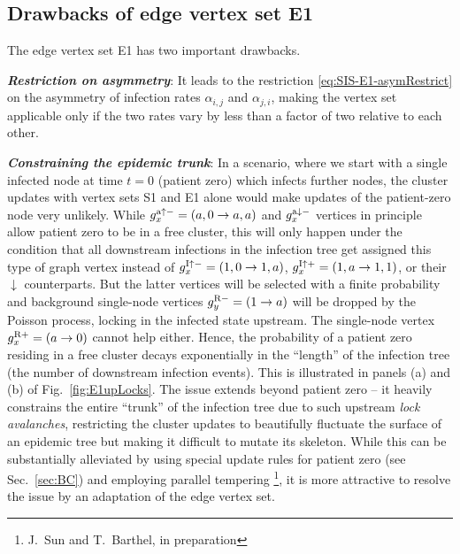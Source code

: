 \documentclass[english,10pt,aps,pra,twocolumn,superscriptaddress,floatfix,fleqn]{revtex4-2}
\newcommand{\tR}{\textnormal{R}}
\newcommand{\tI}{\textnormal{I}}
\newcommand{\ta}{\textnormal{a}}
\newcommand{\Emph}[1]{\emph{\textbf{#1}}}
\let\up\uparrow
\let\dw\downarrow
\begin{document}
\subsection{Drawbacks of edge vertex set \textsc{E1}}\label{sec:SIS-E1-analysis}
The edge vertex set \textsc{E1} has two important drawbacks.

\Emph{Restriction on asymmetry}:
It leads to the restriction \eqref{eq:SIS-E1-asymRestrict} on the asymmetry of infection rates $\alpha_{i,j}$ and $\alpha_{j,i}$, making the vertex set applicable only if the two rates vary by less than a factor of two relative to each other.

\Emph{Constraining the epidemic trunk}:
In a scenario, where we start with a single infected node at time $t=0$ (patient zero) which infects further nodes, the cluster updates with vertex sets \textsc{S1} and \textsc{E1} alone would make updates of the patient-zero node very unlikely. While $g^{\ta\up-}_x=(a,0\to a,a)$ and $g^{\ta\dw-}_x$ vertices in principle allow patient zero to be in a free cluster, this will only happen under the condition that all downstream infections in the infection tree get assigned this type of graph vertex instead of $g^{\tI\up-}_x=(1,0\to 1,a)$, $g^{\tI\up+}_x=(1,a\to 1,1)$, or their $\dw$ counterparts. But the latter vertices will be selected with a finite probability and background single-node vertices $g^{\tR-}_y=(1\to a)$ will be dropped by the Poisson process, locking in the infected state upstream. The single-node vertex $g^{\tR+}_x=(a\to 0)$ cannot help either. Hence, the probability of a patient zero residing in a free cluster decays exponentially in the ``length'' of the infection tree (the number of downstream infection events). This is illustrated in panels (a) and (b) of Fig.~\ref{fig:E1upLocks}.
The issue extends beyond patient zero -- it heavily constrains the entire ``trunk'' of the infection tree due to such upstream \emph{lock avalanches}, restricting the cluster updates to beautifully fluctuate the surface of an epidemic tree but making it difficult to mutate its skeleton. While this can be substantially alleviated by using special update rules for patient zero (see Sec.~\ref{sec:BC}) and employing parallel tempering \footnote{J.\ Sun and T.\ Barthel, in preparation}, it is more attractive to resolve the issue by an adaptation of the edge vertex set.
\end{document}
